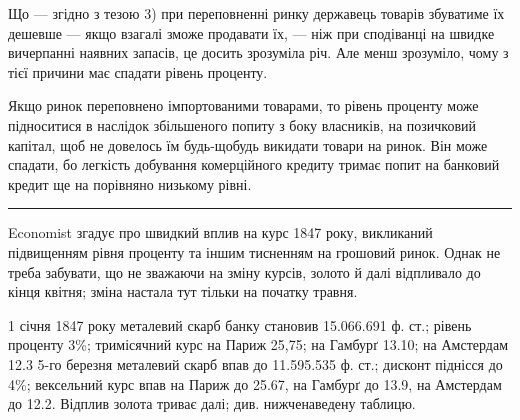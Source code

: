 
Що — згідно з тезою 3) при переповненні ринку державець товарів збуватиме
їх дешевше — якщо взагалі зможе продавати їх, — ніж при сподіванці на
швидке вичерпанні наявних запасів, це досить зрозуміла річ. Але менш зрозуміло,
чому з тієї причини має спадати рівень проценту.

Якщо ринок переповнено імпортованими товарами, то рівень проценту може
підноситися в наслідок збільшеного попиту з боку власників, на позичковий
капітал, щоб не довелось їм будь-щобудь викидати товари на ринок. Він може
спадати, бо легкість добування комерційного кредиту тримає попит на банковий
кредит ще на порівняно низькому рівні.

\pfbreak

Economist згадує про швидкий вплив на курс 1847 року, викликаний
підвищенням рівня проценту та іншим тисненням на грошовий ринок. Однак не
треба забувати, що не зважаючи на зміну курсів, золото й далі відпливало
до кінця квітня; зміна настала тут тільки на початку травня.

1 січня 1847 року металевий скарб банку становив 15.066.691 ф. ст.;
рівень проценту 3\%; тримісячний курс на Париж 25,75; на Гамбурґ 13.10;
на Амстердам 12.3 5-го березня металевий скарб впав до 11.595.535 ф. ст.;
дисконт піднісся до 4\%; вексельний курс впав на Париж до 25.67, на Гамбурґ
до 13.9, на Амстердам до 12.2. Відплив золота триває далі; див.
нижченаведену таблицю.

